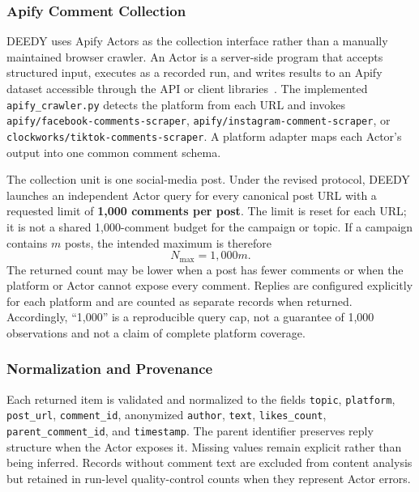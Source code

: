 \documentclass[conference]{IEEEtran}
\begin{document}
\subsubsection{Apify Comment Collection}
\label{sec:apify-collection}

DEEDY uses Apify Actors as the collection interface rather than a manually
maintained browser crawler. An Actor is a server-side program that accepts
structured input, executes as a recorded run, and writes results to an Apify
dataset accessible through the API or client libraries~\cite{apify2026actors}.
The implemented \texttt{apify\_crawler.py} detects the platform from each URL
and invokes \texttt{apify/facebook-comments-scraper},
\texttt{apify/instagram-comment-scraper}, or
\texttt{clockworks/tiktok-comments-scraper}. A platform adapter maps each
Actor's output into one common comment schema.

The collection unit is one social-media post. Under the revised protocol,
DEEDY launches an independent Actor query for every canonical post URL with a
requested limit of
\textbf{1,000 comments per post}. The limit is reset for each URL; it is not a
shared 1,000-comment budget for the campaign or topic. If a campaign contains
$m$ posts, the intended maximum is therefore
\begin{equation}
    N_{\max}=1{,}000m.
\end{equation}
The returned count may be lower when a post has fewer comments or when the
platform or Actor cannot expose every comment. Replies are configured
explicitly for each platform and are counted as separate records when returned.
Accordingly, ``1,000'' is a reproducible query cap, not a guarantee of 1,000
observations and not a claim of complete platform coverage.

\subsubsection{Normalization and Provenance}

Each returned item is validated and normalized to the fields
\texttt{topic}, \texttt{platform}, \texttt{post\_url},
\texttt{comment\_id}, anonymized \texttt{author}, \texttt{text},
\texttt{likes\_count}, \texttt{parent\_comment\_id}, and \texttt{timestamp}.
The parent identifier preserves reply structure when the Actor exposes it.
Missing values remain explicit rather than being inferred. Records without
comment text are excluded from content analysis but retained in run-level
quality-control counts when they represent Actor errors.
\end{document}
